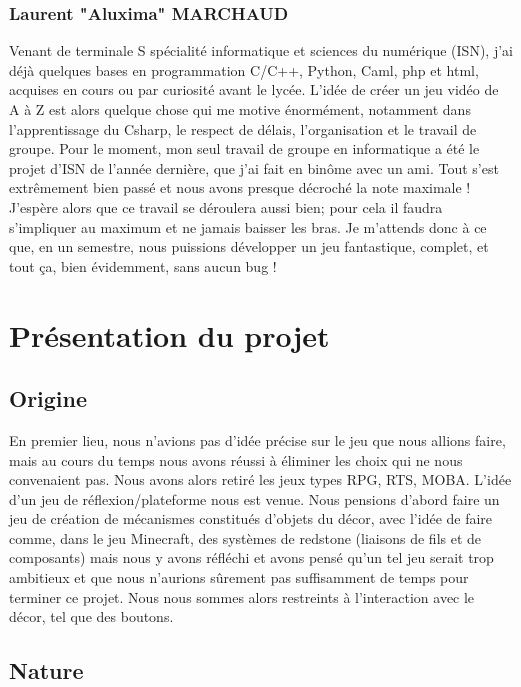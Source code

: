 \documentclass[a4paper]{article}
\begin{document}
		\subsubsection{Laurent "Aluxima" MARCHAUD}

Venant de terminale S spécialité informatique et sciences du numérique (ISN), j’ai déjà quelques bases en programmation C/C++, Python, Caml, php et html, acquises en cours ou par curiosité avant le lycée. L’idée de créer un jeu vidéo de A à Z est alors quelque chose qui me motive énormément, notamment dans l’apprentissage du Csharp, le respect de délais, l’organisation et le travail de groupe. Pour le moment, mon seul travail de groupe en informatique a été le projet d’ISN de l’année dernière, que j’ai fait en binôme avec un ami. Tout s’est extrêmement bien passé et nous avons presque décroché la note maximale ! J’espère alors que ce travail se déroulera aussi bien; pour cela il faudra s’impliquer au maximum et ne jamais baisser les bras.
Je m’attends donc à ce que, en un semestre, nous puissions développer un jeu fantastique, complet, et tout ça, bien évidemment, sans aucun bug !

\newpage

\section {Présentation du projet}
	\subsection{Origine}

En premier lieu, nous n’avions pas d’idée précise sur le jeu que nous allions faire, mais au cours du temps nous avons réussi à éliminer les choix qui ne nous convenaient pas. Nous avons alors retiré les jeux types RPG, RTS, MOBA. L’idée d’un jeu de réflexion/plateforme nous est venue. Nous pensions d’abord faire un jeu de création de mécanismes constitués d’objets du décor, avec l’idée de faire comme, dans le jeu Minecraft, des systèmes de redstone (liaisons de fils et de composants) mais nous y avons réfléchi et avons pensé qu’un tel jeu serait trop ambitieux et que nous n’aurions sûrement pas suffisamment de temps pour terminer ce projet. Nous nous sommes alors restreints à l’interaction avec le décor, tel que des boutons.


	\subsection{Nature}
\end{document}
